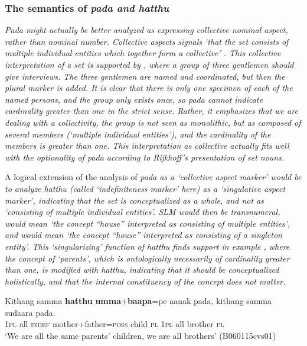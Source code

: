 \subsubsection{The semantics of \em pada \em and \em hatthu\em}\label{sec:morph:Thesemanticsofpadaandhatthu}

\em Pada \em  might actually be better analyzed as expressing \em collective nominal aspect, \em rather than nominal number. Collective aspects signals `that the set consists of multiple individual entities which together form a collective' \citep[102]{Rijkhoff2002}. This collective interpretation of a set is supported by , where a group of three gentlemen should give interviews. The three gentlemen are named and coordinated, but then the plural marker is added.
It is clear that there is only one specimen of each of the named persons, and the group only exists once, so \em pada \em cannot indicate cardinality greater than one in the strict sense. Rather, it emphasizes that we are dealing with a collectivity, the group is not seen as monolithic, but as composed of several members (`multiple individual entities'), and the cardinality of the members is greater than one. This interpretation as collective actually fits well with the optionality of \em pada \em according to Rijkhoff's presentation of \em set nouns\em.

A logical extension of the analysis of \em pada \em as a `collective aspect marker' would be to analyze  \em hatthu \em (called `indefiniteness marker' here) as a `singulative aspect marker', indicating that the set is conceptualized as a whole, and not as `consisting of multiple individual entities'. SLM  would then be transnumeral,  would mean `the concept ``house'' interpreted as consisting of multiple entities', and  would mean `the concept ``house'' interpreted as consisting of a singleton entity'. This `singularizing' function of \em hatthu \em finds support in example , where the concept of `parents', which is ontologically necessarily of cardinality greater than one, is modified with \em hatthu\em, indicating that it should be conceptualized holistically, and that the internal constituency of the concept does not matter.


 
\ea \label{ex:ptcpt:mod:pl:hatthu}
   \gll Kithang samma \textbf{hatthu} \textbf{umma}+\textbf{baapa}=pe      aanak pada, kithang samma sudaara pada. \\
    1\textsc{pl}     all   \textsc{indef}   mother+father=\textsc{poss} child \textsc{pl}   1\textsc{pl}     all   brother \textsc{pl} \\
`We are all the same parents' children, we are all brothers' (B060115cvs01)
\z


